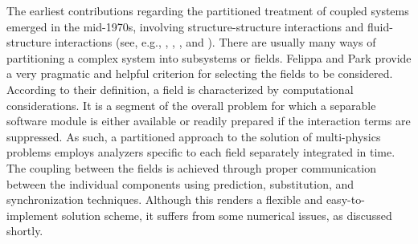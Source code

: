 The earliest contributions regarding the partitioned treatment of coupled systems emerged in the mid-1970s, involving structure-structure interactions and fluid-structure interactions (see, e.g., \cite{belytschko_mesh_1976}, \cite{park_stabilization_1977}, \cite{belytschko_stability_1978}, \cite{hughes_implicit-explicit_1978} and \cite{belytschko_mixed_1979}).
There are usually many ways of partitioning a complex system into subsystems or fields.
Felippa and Park \citep{felippa_staggered_1980} provide a very pragmatic and helpful criterion for selecting the fields to be considered.
According to their definition, a field is characterized by computational considerations.
It is a segment of the overall problem for which a separable software module is either available or readily prepared if the interaction terms are suppressed.
As such, a partitioned approach to the solution of multi-physics problems employs analyzers specific to each field separately integrated in time.
The coupling between the fields is achieved through proper communication between the individual components using prediction, substitution, and synchronization techniques.
Although this renders a flexible and easy-to-implement solution scheme, it suffers from some numerical issues, as discussed shortly.

